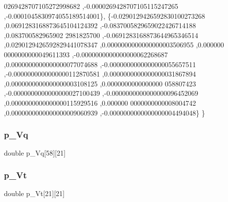 \begin{DoxyCode}
      0269428707105272998682 ,-0.0000269428707105115247265 ,-0.0001045830974055189514001\},
\{-0.0290129426592830100273268 ,0.0691283168873645104124392 ,-0.0837005829659022426714188 ,0.083700582965902
      2981825700 ,-0.0691283168873644965346514 ,0.0290129426592829441078347 ,0.0000000000000000003506955 ,0.000000
      0000000000049611393 ,-0.0000000000000000062268687 ,0.0000000000000000077074688 ,-0.0000000000000000055657511
       ,-0.0000000000000000112870581 ,0.0000000000000000031867894 ,0.0000000000000000003108125 ,0.0000000000000000
      058807423 ,-0.0000000000000000027100439 ,-0.0000000000000000096452069 ,0.0000000000000000115929516 ,0.000000
      0000000000008004742 ,0.0000000000000000009060939 ,-0.0000000000000000004494048\}
\}
\end{DoxyCode}
\mbox{\label{a00458_ad03c7642e36bfdfc22660c280c68820f}} 
\subsubsection{\texorpdfstring{p\+\_\+\+Vq}{p\_Vq}}
{\footnotesize\ttfamily double p\+\_\+\+Vq\mbox{[}58\mbox{]}\mbox{[}21\mbox{]}}

\mbox{\label{a00458_aa2333d0091d643a332b9667da158deac}} 
\subsubsection{\texorpdfstring{p\+\_\+\+Vt}{p\_Vt}}
{\footnotesize\ttfamily double p\+\_\+\+Vt\mbox{[}21\mbox{]}\mbox{[}21\mbox{]}}

